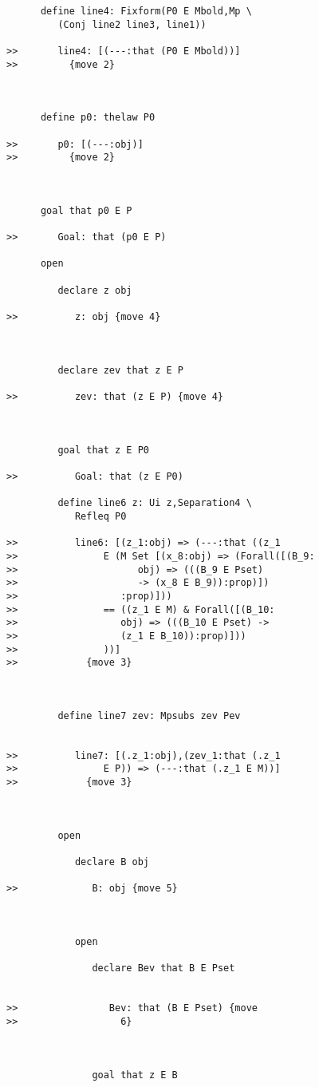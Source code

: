 \documentclass[12pt]{article}
\begin{document}
\begin{verbatim}
      define line4: Fixform(P0 E Mbold,Mp \
         (Conj line2 line3, line1))

>>       line4: [(---:that (P0 E Mbold))]
>>         {move 2}



      define p0: thelaw P0

>>       p0: [(---:obj)]
>>         {move 2}



      goal that p0 E P

>>       Goal: that (p0 E P)

      open

         declare z obj

>>          z: obj {move 4}



         declare zev that z E P

>>          zev: that (z E P) {move 4}



         goal that z E P0

>>          Goal: that (z E P0)

         define line6 z: Ui z,Separation4 \
            Refleq P0

>>          line6: [(z_1:obj) => (---:that ((z_1
>>               E (M Set [(x_8:obj) => (Forall([(B_9:
>>                     obj) => (((B_9 E Pset)
>>                     -> (x_8 E B_9)):prop)])
>>                  :prop)]))
>>               == ((z_1 E M) & Forall([(B_10:
>>                  obj) => (((B_10 E Pset) ->
>>                  (z_1 E B_10)):prop)]))
>>               ))]
>>            {move 3}



         define line7 zev: Mpsubs zev Pev


>>          line7: [(.z_1:obj),(zev_1:that (.z_1
>>               E P)) => (---:that (.z_1 E M))]
>>            {move 3}



         open

            declare B obj

>>             B: obj {move 5}



            open

               declare Bev that B E Pset


>>                Bev: that (B E Pset) {move
>>                  6}



               goal that z E B


\end{verbatim}
\end{document}

